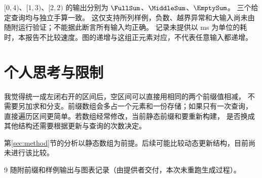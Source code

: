\documentclass[a4paper,11pt,fontset=fandol]{ctexart}
\begin{document}
$[0,4)$、$[1,3)$、$[2,2)$ 的输出分别为 $\FullSum$、$\MiddleSum$、$\EmptySum$。
三个给定查询均与独立手算一致。
这仅支持所列样例，负数、越界异常和大输入尚未由随附运行验证；不能据此断言所有输入均正确。
记录未提供以 ms 为单位的耗时，本报告不比较速度。图的递增与这组正元素对应，不代表任意输入都递增。

\section{个人思考与限制}
\label{sec:thoughts}
我觉得统一成左闭右开的区间后，空区间可以直接用相同的两个前缀值相减，
不需要另加求和分支。前缀数组会多占一个元素和一份存储；如果只有一次查询，
直接遍历区间更简单。若数组经常修改，当前静态前缀和要重新构建，
是否换成其他结构还需要根据更新与查询的次数决定。

第\ref{sec:method}节的分析以静态数组为前提。后续可能比较动态更新结构，目前尚未进行该比较。
\begin{thebibliography}{9}
 随附前缀和样例输出与图表记录（由提供者交付，本次未重跑生成过程）。
\end{thebibliography}
\end{document}

